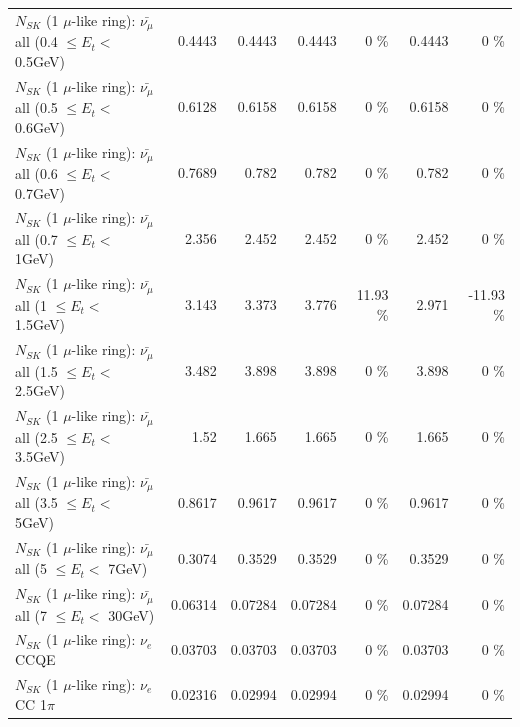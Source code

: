 \begin{table}
\begin{tabular}{| l | r | r | r  r | r  r |}
 $N_{SK}$ (1 $\mu$-like ring): $\bar{\nu_{\mu}}$ all (0.4 $\leq E_{t} <$ 0.5GeV) &          0.4443 &          0.4443 &          0.4443 &        0 \%  &          0.4443 &        0 \%  \\ 
 $N_{SK}$ (1 $\mu$-like ring): $\bar{\nu_{\mu}}$ all (0.5 $\leq E_{t} <$ 0.6GeV) &          0.6128 &          0.6158 &          0.6158 &        0 \%  &          0.6158 &        0 \%  \\ 
 $N_{SK}$ (1 $\mu$-like ring): $\bar{\nu_{\mu}}$ all (0.6 $\leq E_{t} <$ 0.7GeV) &          0.7689 &           0.782 &           0.782 &        0 \%  &           0.782 &        0 \%  \\ 
   $N_{SK}$ (1 $\mu$-like ring): $\bar{\nu_{\mu}}$ all (0.7 $\leq E_{t} <$ 1GeV) &           2.356 &           2.452 &           2.452 &        0 \%  &           2.452 &        0 \%  \\ 
   $N_{SK}$ (1 $\mu$-like ring): $\bar{\nu_{\mu}}$ all (1 $\leq E_{t} <$ 1.5GeV) &           3.143 &           3.373 &           3.776 &    11.93 \%  &           2.971 &   -11.93 \%  \\ 
 $N_{SK}$ (1 $\mu$-like ring): $\bar{\nu_{\mu}}$ all (1.5 $\leq E_{t} <$ 2.5GeV) &           3.482 &           3.898 &           3.898 &        0 \%  &           3.898 &        0 \%  \\ 
 $N_{SK}$ (1 $\mu$-like ring): $\bar{\nu_{\mu}}$ all (2.5 $\leq E_{t} <$ 3.5GeV) &            1.52 &           1.665 &           1.665 &        0 \%  &           1.665 &        0 \%  \\ 
   $N_{SK}$ (1 $\mu$-like ring): $\bar{\nu_{\mu}}$ all (3.5 $\leq E_{t} <$ 5GeV) &          0.8617 &          0.9617 &          0.9617 &        0 \%  &          0.9617 &        0 \%  \\ 
     $N_{SK}$ (1 $\mu$-like ring): $\bar{\nu_{\mu}}$ all (5 $\leq E_{t} <$ 7GeV) &          0.3074 &          0.3529 &          0.3529 &        0 \%  &          0.3529 &        0 \%  \\ 
    $N_{SK}$ (1 $\mu$-like ring): $\bar{\nu_{\mu}}$ all (7 $\leq E_{t} <$ 30GeV) &         0.06314 &         0.07284 &         0.07284 &        0 \%  &         0.07284 &        0 \%  \\ 
\hline
\hline
\hline
                                      $N_{SK}$ (1 $\mu$-like ring): $\nu_e$ CCQE &         0.03703 &         0.03703 &         0.03703 &        0 \%  &         0.03703 &        0 \%  \\ 
                                 $N_{SK}$ (1 $\mu$-like ring): $\nu_e$ CC 1$\pi$ &         0.02316 &         0.02994 &         0.02994 &        0 \%  &         0.02994 &        0 \%  \\ 

\end{tabular}
\end{table}
